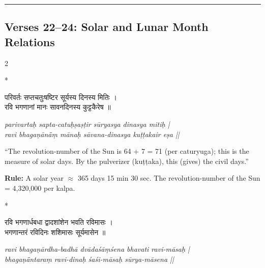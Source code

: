 \documentclass[11pt,a4paper]{article}
\newcommand{\dev}[1]{{\devanagarifont #1}}
\theoremstyle{definition}
\begin{document}
\vspace{0.5cm}
\noindent\rule{\textwidth}{0.6pt}
\vspace{0.5cm}

\subsection*{Verses 22--24: Solar and Lunar Month Relations}

\begin{paracol}{2}

\switchcolumn[0]*\noindent
\begin{tcolorbox}[colback=sktbg,colframe=vertrule,boxrule=0.5pt,arc=3pt,title={\small\bfseries Verse 22}]
\dev{परिवर्तः सप्तचतुःषष्टिर सूर्यस्य दिनस्य मितिः ।\\
रवि भगणानां मानः सावनदिनस्य कुट्टकैरेष ॥}
\end{tcolorbox}

\switchcolumn\noindent
\begin{tcolorbox}[colback=transbg,colframe=vertrule!60,boxrule=0.5pt,arc=3pt,title={\small\bfseries Translation 22}]
\textit{parivarta\d{h} sapta-catu\d{h}\d{s}a\d{s}\d{t}ir s\=uryasya dinasya miti\d{h} |\\
ravi bhaga\d{n}\=an\=\=a\d{m} m\=ana\d{h} s\=avana-dinasya ku\d{t}\d{t}akair e\d{s}a ||}

``The revolution-number of the Sun is 64 + 7 = 71 (per caturyuga); this is the measure of solar days. By the pulverizer (ku\d{t}\d{t}aka), this (gives) the civil days.''

\textbf{Rule:} A solar year $\approx$ 365 days 15 min 30 sec. The revolution-number of the Sun = 4,320,000 per kalpa.
\end{tcolorbox}

\switchcolumn[0]*\noindent
\begin{tcolorbox}[colback=sktbg,colframe=vertrule,boxrule=0.5pt,arc=3pt,title={\small\bfseries Verse 23}]
\dev{रवि भगणार्धबधा द्वादशांशेन भवति रविमासः ।\\
भगणान्तरं रविदिनः शशिमासः सूर्यमासेन ॥}
\end{tcolorbox}

\switchcolumn\noindent
\begin{tcolorbox}[colback=transbg,colframe=vertrule!60,boxrule=0.5pt,arc=3pt,title={\small\bfseries Translation 23}]
\textit{ravi bhaga\d{n}\=ardha-badh\=a dv\=ada\'{s}\=a\d{m}\'sena bhavati ravi-m\=asa\d{h} |\\
bhaga\d{n}\=\=antara\d{m} ravi-dina\d{h} \'{s}a\'{s}i-m\=asa\d{h} s\=urya-m\=asena ||}


\end{tcolorbox}
\end{paracol}
\end{document}
